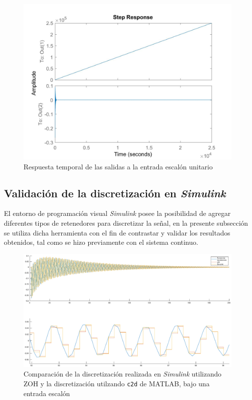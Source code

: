 \documentclass[journal]{IEEEtran}
\begin{document}
\begin{figure}[!h]
\caption{Respuesta temporal de las salidas a la entrada escalón unitario\label{fig:stepGd}}
  \centering
\includegraphics[scale=0.18]{tf/step_Gd.jpg}
\end{figure}

\subsection{Validación de la discretización en \textit{Simulink}}
El entorno de programación visual \textit{Simulink} posee la posibilidad de agregar diferentes tipos de retenedores para discretizar la señal, en la presente subsección se utiliza dicha herramienta con el fin de contrastar y validar los resultados obtenidos, tal como se hizo previamente con el sistema continuo.\\

\begin{figure}[t!]
\caption{Comparación de la discretización realizada en \textit{Simulink} utilizando ZOH y la discretización utilzando \texttt{c2d} de MATLAB, bajo una entrada escalón\label{fig:dis5}}
\includegraphics[scale=0.19]{5.eps}
\end{figure}
\end{document}
